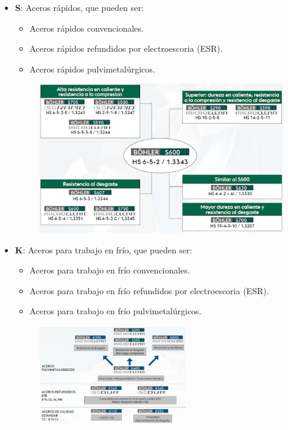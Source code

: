 \documentclass[12pt,a4paper]{article}
\begin{document}
\begin{itemize}
    \item \textbf{S}: Aceros rápidos, que pueden ser:
    \begin{itemize}
        \item Aceros rápidos convencionales.
        \item Aceros rápidos refundidos por electroescoria (ESR).
        \item Aceros rápidos pulvimetalúrgicos.
    \end{itemize}
        \begin{figure}[H]    
        \centering         
        \includegraphics[width=0.7\linewidth]{Inagenes para latex/1.png}
    \end{figure}
    \item \textbf{K}: Aceros para trabajo en frío, que pueden ser:
    \begin{itemize}
        \item Aceros para trabajo en frío convencionales.
        \item Aceros para trabajo en frío refundidos por electroescoria (ESR).
        \item Aceros para trabajo en frío pulvimetalúrgicos.
    \end{itemize}
    \begin{figure}[H]    
        \centering         
        \includegraphics[width=0.6\textwidth]{Inagenes para latex/2.png}
    \end{figure}

\end{itemize}
\end{document}
